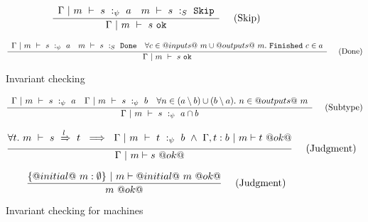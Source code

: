 \begin{figure*}
$$
\frac {\displaystyle 
    \begin{array}{lr}
        \Gamma ~|~ m ~\vdash~ s ~:_\psi~ a                &
        m ~\vdash~ s ~:_S~ \mathtt{Skip}
    \end{array}
} {\displaystyle  
    \Gamma ~|~ m ~\vdash~ s~\mathtt{ok}
} \ 
\quad
\textrm{(Skip)}
$$

$$
\frac {\displaystyle 
    \begin{array}{lcr}
        \Gamma ~|~ m ~\vdash~ s ~:_\psi~ a                &
        m ~\vdash~ s ~:_S~ \mathtt{Done}    &
        \forall c \in @inputs@~m \cup @outputs@~m.~ \mathtt{Finished}~c \in a
    \end{array}
} {\displaystyle  
    \Gamma ~|~ m ~\vdash~ s~\mathtt{ok}
} \ 
\quad
\textrm{(Done)}
$$

\caption{Invariant checking}
\label{fig:inv:checking}
\end{figure*}

\begin{figure*}


$$
\frac {\displaystyle 
    \begin{array}{lcr}
        \Gamma ~|~ m ~\vdash~ s ~:_\psi~ a      &
        \Gamma ~|~ m ~\vdash~ s ~:_\psi~ b      &
        \forall n \in (a \setminus b) \cup (b \setminus a).~ n \in @outputs@~m
    \end{array}
} {\displaystyle  
     \Gamma  ~|~ m ~\vdash~  s  ~:_\psi~  a \cap b 
} \ 
\quad
\textrm{(Subtype)}
$$

$$
\frac {\displaystyle 
    \forall t.\
    m ~\vdash~ s ~\xRightarrow{l}~ t~\implies~
    \Gamma ~|~ m ~\vdash~ t ~:_\psi~ b 
    ~\wedge~
    \Gamma, t : b ~|~ m \vdash t~@ok@
} {\displaystyle  
    \Gamma ~|~ m \vdash s~@ok@
} \ 
\quad
\textrm{(Judgment)}
$$

$$
\frac {\displaystyle 
    \{ @initial@~m : \emptyset \} ~|~ m \vdash @initial@~m~@ok@
} {\displaystyle  
    m~@ok@
} \ 
\quad
\textrm{(Judgment)}
$$


\caption{Invariant checking for machines}
\label{fig:invariants}
\end{figure*}

